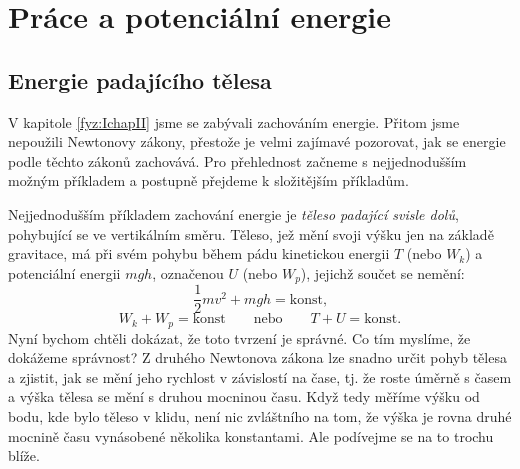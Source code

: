 \chapter{Práce a potenciální energie}\label{fyz:chap_fey_work}
\minitoc
  \section{Energie padajícího tělesa}
    V kapitole \ref{fyz:IchapII} jsme se zabývali zachováním energie. Přitom jsme nepoužili 
    Newtonovy zákony, přestože je velmi zajímavé pozorovat, jak se energie podle těchto zákonů 
    zachovává. Pro přehlednost začneme s nejjednodušším možným příkladem a postupně přejdeme k 
    složitějším příkladům.
    
    Nejjednodušším příkladem zachování energie je \emph{těleso padající svisle dolů}, pohybující se 
    ve vertikálním směru. Těleso, jež mění svoji výšku jen na základě gravitace, má při svém pohybu 
    během pádu kinetickou energii \(T\) (nebo \(W_k\)) a potenciální energii \(mgh\), označenou 
    \(U\) (nebo \(W_p\)), jejichž součet se nemění:
    \begin{equation}\label{FYZ:eq025}
      \frac{1}{2}mv^2 + mgh = \text{konst,}
    \end{equation}
    \begin{equation*}
      W_k + W_p = \text{konst} \qquad \text{nebo} \qquad T + U = \text{konst}.
    \end{equation*}
    Nyní bychom chtěli dokázat, že toto tvrzení je správné. Co tím myslíme, že dokážeme správnost? 
    Z druhého Newtonova zákona lze snadno určit pohyb tělesa a zjistit, jak se mění jeho rychlost v 
    závislostí na čase, tj. že roste úměrně s časem a výška tělesa se mění s druhou mocninou času. 
    Když tedy měříme výšku od bodu, kde bylo těleso v klidu, není nic zvláštního na tom, že výška 
    je rovna druhé mocnině času vynásobené několika konstantami. Ale podívejme se na to trochu 
    blíže.
    
